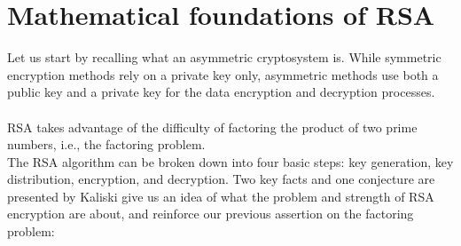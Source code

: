 \documentclass[12pt, a4paper]{article}
\begin{document}
\section{Mathematical foundations of RSA}\label{mathematical foundations of RSA}
Let us start by recalling what an asymmetric cryptosystem is. While symmetric encryption methods rely on a private key only, asymmetric methods use both a public key and a private key for the data encryption and decryption processes. \\ \\
RSA takes advantage of the difficulty of factoring the product of two prime numbers, i.e., the factoring problem. \\ 
The RSA algorithm can be broken down into four basic steps: key generation, key distribution, encryption, and decryption.
Two key facts and one conjecture are presented by Kaliski give us an idea of what the problem and strength of RSA encryption are about, and reinforce our previous assertion on the factoring problem:
\end{document}
